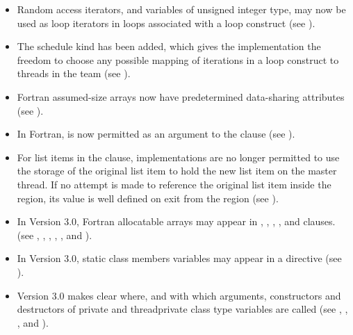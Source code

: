 \begin{itemize}
\item Random access iterators, and variables of unsigned integer type, may now be used as 
loop iterators in loops associated with a loop construct (see 
). 

\item The schedule kind  has been added, which gives the implementation the 
freedom to choose any possible mapping of iterations in a loop construct to threads in 
the team (see ).

\item Fortran assumed-size arrays now have predetermined data-sharing attributes (see 
).

\item In Fortran,  is now permitted as an argument to the  
clause (see 
).

\item For list items in the  clause, implementations are no longer permitted to use 
the storage of the original list item to hold the new list item on the master thread. If 
no attempt is made to reference the original list item inside the  region, its 
value is well defined on exit from the  region (see 
).

\item In Version 3.0, Fortran allocatable arrays may appear in , 
, , ,  and  
clauses. (see 
, 
, 
, 
,
, 
 and 
). 

\item In Version 3.0, static class members variables may appear in a  
directive (see 
). 

\item Version 3.0 makes clear where, and with which arguments, constructors and 
destructors of private and threadprivate class type variables are called (see 
, 
, 
,
 and 
).


\end{itemize}
